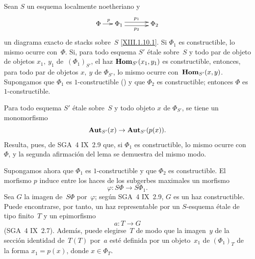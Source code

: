 \shorthandoff{<>}%

\setcounter{subsection}{1}
\setcounter{subsubsection}{0}
\begin{sublemme}
\label{XIII.3.1.1}
Sean $S$ un esquema localmente noetheriano y
$$
\xymatrix@C=.5cm{ \Phi \ar[r]^p & \Phi_1 \ar@<0.6ex>[rr]^{p_1}
\ar@<-0.6ex>[rr]_{p_2} && \Phi_2 }
$$
un diagrama exacto de stacks sobre~$S$ \eqref{XIII.1.10.1}. Si $\Phi_1$
es constructible, lo mismo ocurre con~$\Phi$. Si, para todo esquema
$S'$ étale sobre~$S$ y todo par
{de objeto}
{de objetos}
$x_1,~y_1$ de~$(\Phi_1)_{S'}$, el haz $\operatorname{\mathbf{Hom}}_{S'}(x_1,y_1)$ es
constructible, entonces, para todo par de objetos $x,~y$ de
$\Phi_{S'}$, lo mismo ocurre con~$\operatorname{\mathbf{Hom}}_{S'}(x,y)$. Supongamos que
$\Phi_1$ es $1$-constructible () y que $\Phi_2$ es
constructible; entonces $\Phi$ es $1$-constructible.
\end{sublemme}

Para todo esquema $S'$ étale sobre~$S$ y todo objeto $x$ de
$\Phi_{S'}$, se tiene un monomorfismo
$$
\operatorname{\mathbf{Aut}}_{S'}(x)\to\operatorname{\mathbf{Aut}}_{S'}(p(x)).
$$
Resulta, pues, de SGA~4 IX~2.9 que, si $\Phi_1$ es constructible,
lo mismo ocurre con~$\Phi$, y la segunda afirmación del lema se
demuestra del mismo modo.

Supongamos ahora que $\Phi_1$ es $1$-constructible y que $\Phi_2$ es
constructible. El morfismo $p$ induce entre los haces de los subgerbes
maximales un morfismo
$$
\varphi\colon S\Phi\to S\Phi_1.
$$
Sea $G$ la imagen de~$S\Phi$ por~$\varphi$; según SGA~4 IX~2.9,
$G$ es un haz constructible. Puede encontrarse, por tanto, un haz
representable por un $S$-esquema étale de tipo finito~$T$ y un
epimorfismo
$$
a\colon T\to G
$$
(SGA~4 IX~2.7).
Además, puede elegirse~$T$ de modo que la imagen~$y$ de la sección
identidad de~$T(T)$ por~$a$ esté definida por un objeto~$x_1$ de
$(\Phi_1)_T$ de la forma $x_1=p(x)$, donde $x\in\Phi_T$.

